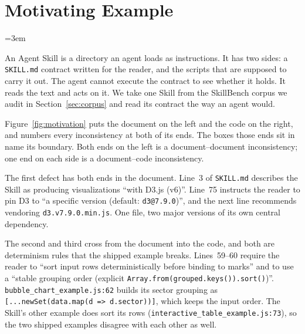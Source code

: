 \section{Motivating Example}
\label{sec:motivation}
%
\begingroup\emergencystretch=3em

An Agent Skill is a directory an agent loads as instructions. It has two sides:
a \texttt{SKILL.md} contract written for the reader, and the scripts that are
supposed to carry it out. The agent cannot execute the contract to see whether
it holds. It reads the text and acts on it. We take one Skill from the SkillBench
corpus we audit in Section~\ref{sec:corpus} and read its contract the way an
agent would.

Figure~\ref{fig:motivation} puts the document on the left and the code on the
right, and numbers every inconsistency at both of its ends. The boxes those ends
sit in name its boundary. Both ends on the left is a document--document
inconsistency; one end on each side is a document--code inconsistency.

The first defect has both ends in the document. Line~3 of \texttt{SKILL.md}
describes the Skill as producing visualizations ``with D3.js (v6)''. Line~75
instructs the reader to pin D3 to ``a specific version (default:
\texttt{d3@7.9.0})'', and the next line recommends vendoring
\texttt{d3.v7.9.0.min.js}. One file, two major versions of its own central
dependency.

The second and third cross from the document into the code, and both are
determinism rules that the shipped example breaks. Lines~59--60 require the
reader to ``sort input rows deterministically before binding to marks'' and to
use a ``stable grouping order (explicit
\texttt{Array.from(grouped\allowbreak{}.keys()).sort()})''.
\texttt{bubble\_\allowbreak{}chart\_\allowbreak{}example.js:62} builds its sector grouping as
\texttt{[...new\allowbreak{}Set(data.map(d\allowbreak{} => d.sector))]}, which keeps the input order. The
Skill's other example does sort its rows
(\texttt{interactive\_\allowbreak{}table\_\allowbreak{}example.js:73}), so the two shipped examples
disagree with each other as well.

